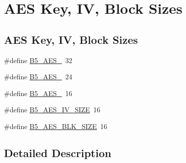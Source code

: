 \hypertarget{group__aes_keys}{\section{A\-E\-S Key, I\-V, Block Sizes}
\label{group__aes_keys}
}
\subsection*{A\-E\-S Key, I\-V, Block Sizes}
\begin{DoxyCompactItemize}
\item 
\#define \hyperlink{group__aes_keys_gaaa12529ea4bb869bdc8f535b81045936}{B5\-\_\-\-A\-E\-S\-\_}~32
\item 
\#define \hyperlink{group__aes_keys_ga2c5c2d32e434e577808b530494dbf45a}{B5\-\_\-\-A\-E\-S\-\_}~24
\item 
\#define \hyperlink{group__aes_keys_ga4219b772a2b3f05a3160ae82a1440519}{B5\-\_\-\-A\-E\-S\-\_}~16
\item 
\#define \hyperlink{group__aes_keys_gacdb3619e3b9cfdf86bd929b2ad3786ad}{B5\-\_\-\-A\-E\-S\-\_\-\-I\-V\-\_\-\-S\-I\-Z\-E}~16
\item 
\#define \hyperlink{group__aes_keys_ga64a33b32fc1ab72a27a36a63a66c5774}{B5\-\_\-\-A\-E\-S\-\_\-\-B\-L\-K\-\_\-\-S\-I\-Z\-E}~16
\end{DoxyCompactItemize}


\subsection{Detailed Description}


